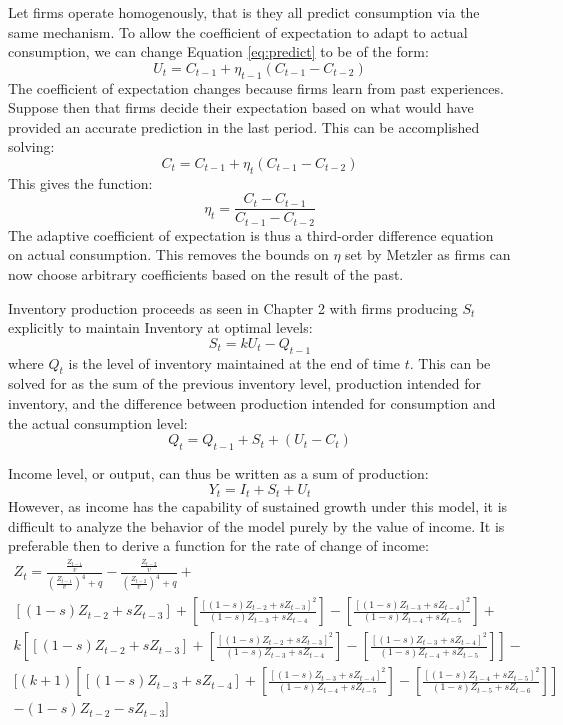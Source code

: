 Let firms operate homogenously, that is they all predict consumption via the same mechanism. To allow the coefficient of expectation to adapt to actual consumption, we can change Equation \ref{eq:predict} to be of the form:
\begin{equation}
    U_t=C_{t-1}+\eta_{t-1}(C_{t-1}-C_{t-2})
\end{equation}
The coefficient of expectation changes because firms learn from past experiences. Suppose then that firms decide their expectation based on what would have provided an accurate prediction in the last period. This can be accomplished solving:
\begin{equation*}
    C_t=C_{t-1}+\eta_t(C_{t-1}-C_{t-2})
\end{equation*}
This gives the function:
\begin{equation}\label{eq:adaptive}
    \eta_t=\frac{C_t-C_{t-1}}{C_{t-1}-C_{t-2}}
\end{equation}
The adaptive coefficient of expectation is thus a third-order difference equation on actual consumption. This removes the bounds on $\eta$ set by Metzler as firms can now choose arbitrary coefficients based on the result of the past. 

Inventory production proceeds as seen in Chapter 2 with firms producing $S_t$ explicitly to maintain Inventory at optimal levels:
\begin{equation}
    S_t = k U_t-Q_{t-1}
\end{equation}
where $Q_t$ is the level of inventory maintained at the end of time $t$. This can be solved for as the sum of the previous inventory level, production intended for inventory, and the difference between production intended for consumption and the actual consumption level:
\begin{equation}
    Q_t=Q_{t-1}+S_t+(U_t-C_t)
\end{equation}

Income level, or output, can thus be written as a sum of production:
\begin{equation}
    Y_t=I_t+S_t+U_t
\end{equation}
However, as income has the capability of sustained growth under this model, it is difficult to analyze the behavior of the model purely by the value of income. It is preferable then to derive a function for the rate of change of income:
\begin{multline}
    Z_{t} = \frac{\frac{Z_{t-1}}{v}}{\left(\frac{Z_{t-1}}{v}\right)^4+q}-\frac{\frac{Z_{t-2}}{v}}{\left(\frac{Z_{t-2}}{v}\right)^4+q}+\\
    [(1-s)Z_{t-2}+sZ_{t-3}]+\left[\frac{[(1-s)Z_{t-2}+sZ_{t-3}]^2}{(1-s)Z_{t-3}+sZ_{t-4}}\right]-\left[\frac{[(1-s)Z_{t-3}+sZ_{t-4}]^2}{(1-s)Z_{t-4}+sZ_{t-5}}\right]+\\
    k\left[[(1-s)Z_{t-2}+sZ_{t-3}]+\left[\frac{[(1-s)Z_{t-2}+sZ_{t-3}]^2}{(1-s)Z_{t-3}+sZ_{t-4}}\right]-\left[\frac{[(1-s)Z_{t-3}+sZ_{t-4}]^2}{(1-s)Z_{t-4}+sZ_{t-5}}\right]\right]-\\
    [(k+1)\left[[(1-s)Z_{t-3}+sZ_{t-4}]+\left[\frac{[(1-s)Z_{t-3}+sZ_{t-4}]^2}{(1-s)Z_{t-4}+sZ_{t-5}}\right]-\left[\frac{[(1-s)Z_{t-4}+sZ_{t-5}]^2}{(1-s)Z_{t-5}+sZ_{t-6}}\right]\right]\\
    -(1-s)Z_{t-2}-sZ_{t-3}]
\end{multline}